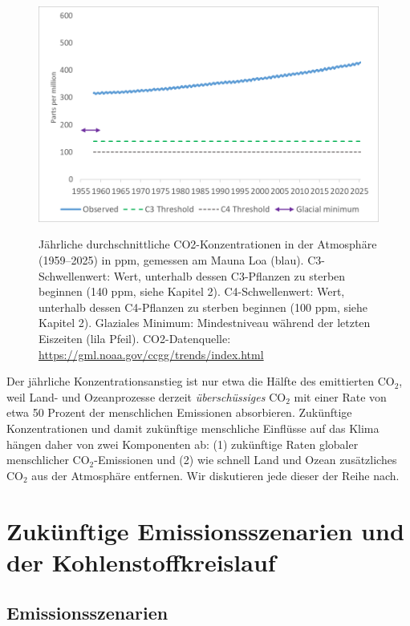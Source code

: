 \documentclass[12pt,paper=a4,DIV=12,parskip=never,chapterprefix=false,headings=standardclasses]{scrreprt}
\begin{document}
\begin{figure}[H]
\begin{center}
\includegraphics[width=1.0\textwidth]{bilder/bilderKlima-0009.png}\\[1cm]
\end{center}
\caption{Jährliche durchschnittliche CO2-Konzentrationen in der Atmosphäre (1959–2025) in ppm, gemessen am
Mauna Loa (blau). C3-Schwellenwert: Wert, unterhalb dessen C3-Pflanzen zu sterben beginnen (140 ppm, siehe
Kapitel 2). C4-Schwellenwert: Wert, unterhalb dessen C4-Pflanzen zu sterben beginnen (100 ppm, siehe Kapitel 2).
Glaziales Minimum: Mindestniveau während der letzten Eiszeiten (lila Pfeil). CO2-Datenquelle:
\url{https://gml.noaa.gov/ccgg/trends/index.html}}
\end{figure}

Der jährliche Konzentrationsanstieg ist nur etwa die Hälfte des emittierten CO$_2$, weil Land- und Ozeanprozesse derzeit \emph{überschüssiges} CO$_2$ mit einer Rate von etwa 50 Prozent der menschlichen Emissionen absorbieren. Zukünftige Konzentrationen und damit zukünftige menschliche Einflüsse auf das Klima hängen daher von zwei Komponenten ab: (1) zukünftige Raten globaler menschlicher CO$_2$-Emissionen und (2) wie schnell Land und Ozean zusätzliches CO$_2$ aus der Atmosphäre entfernen. Wir diskutieren jede dieser der Reihe nach.

\section{Zukünftige Emissionsszenarien und der Kohlenstoffkreislauf}

\subsection{Emissionsszenarien}
\end{document}

